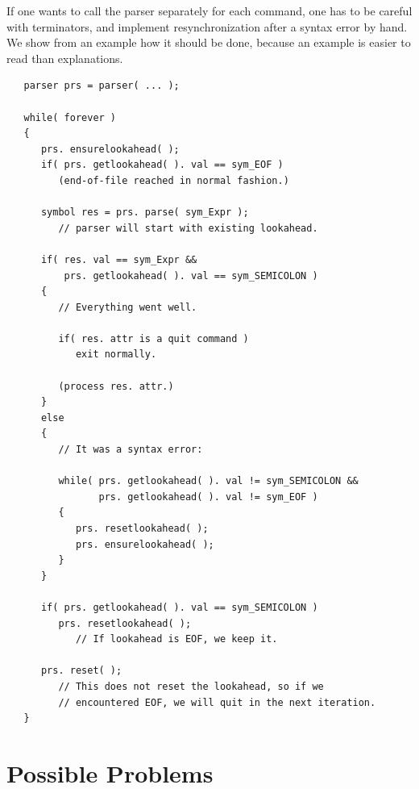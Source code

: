 \documentclass{article}
\begin{document}
If one wants to call the parser separately for each command, 
one has to be careful with terminators, and implement resynchronization
after a syntax error by hand.
We show from an example how it should be done,
because an example is easier to read than explanations. 
\begin{verbatim}
   parser prs = parser( ... );
  
   while( forever ) 
   {
      prs. ensurelookahead( ); 
      if( prs. getlookahead( ). val == sym_EOF )
         (end-of-file reached in normal fashion.)

      symbol res = prs. parse( sym_Expr );
         // parser will start with existing lookahead.

      if( res. val == sym_Expr && 
          prs. getlookahead( ). val == sym_SEMICOLON )
      {
         // Everything went well. 

         if( res. attr is a quit command ) 
            exit normally. 

         (process res. attr.) 
      }
      else
      {
         // It was a syntax error: 
        
         while( prs. getlookahead( ). val != sym_SEMICOLON &&
                prs. getlookahead( ). val != sym_EOF )
         {
            prs. resetlookahead( );
            prs. ensurelookahead( );
         }
      }

      if( prs. getlookahead( ). val == sym_SEMICOLON )
         prs. resetlookahead( );
            // If lookahead is EOF, we keep it.

      prs. reset( );  
         // This does not reset the lookahead, so if we
         // encountered EOF, we will quit in the next iteration. 
   } 
\end{verbatim}

\section{Possible Problems}
\end{document}
